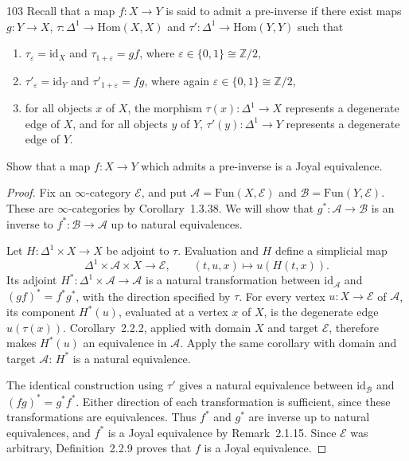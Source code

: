 \begin{exercise}{103}
Recall that a map $f\colon X\to Y$ is said to admit a pre-inverse if there exist maps
$g\colon Y\to X$, $\tau\colon\Delta^1\to\mathrm{Hom}(X,X)$ and
$\tau'\colon\Delta^1\to\mathrm{Hom}(Y,Y)$ such that
\begin{enumerate}[label=(\arabic*)]
 \item $\tau_\varepsilon=\mathrm{id}_X$ and $\tau_{1+\varepsilon}=gf$, where
       $\varepsilon\in\{0,1\}\cong\mathbb Z/2$,
 \item $\tau'_\varepsilon=\mathrm{id}_Y$ and $\tau'_{1+\varepsilon}=fg$, where again
       $\varepsilon\in\{0,1\}\cong\mathbb Z/2$,
 \item for all objects $x$ of $X$, the morphism $\tau(x)\colon\Delta^1\to X$
       represents a degenerate edge of $X$, and for all objects $y$ of $Y$,
       $\tau'(y)\colon\Delta^1\to Y$ represents a degenerate edge of $Y$.
\end{enumerate}
Show that a map $f\colon X\to Y$ which admits a pre-inverse is a Joyal equivalence.

\begin{proof}
Fix an $\infty$-category $\mathcal E$, and put
$\mathcal A=\mathrm{Fun}(X,\mathcal E)$ and
$\mathcal B=\mathrm{Fun}(Y,\mathcal E)$.
These are $\infty$-categories by Corollary~1.3.38.
We will show that $g^*\colon\mathcal A\to\mathcal B$ is an inverse to
$f^*\colon\mathcal B\to\mathcal A$ up to natural equivalences.

Let $H\colon\Delta^1\times X\to X$ be adjoint to $\tau$.
Evaluation and $H$ define a simplicial map
\[
 \Delta^1\times\mathcal A\times X\longrightarrow\mathcal E,
 \qquad (t,u,x)\longmapsto u(H(t,x)).
\]
Its adjoint $H^*\colon\Delta^1\times\mathcal A\to\mathcal A$ is a
natural transformation between $\mathrm{id}_{\mathcal A}$ and
$(gf)^*=f^*g^*$, with the direction specified by $\tau$.
For every vertex $u\colon X\to\mathcal E$ of $\mathcal A$, its component
$H^*(u)$, evaluated at a vertex $x$ of $X$, is the degenerate edge
$u(\tau(x))$.
Corollary~2.2.2, applied with domain $X$ and target $\mathcal E$,
therefore makes $H^*(u)$ an equivalence in $\mathcal A$.
Apply the same corollary with domain and target $\mathcal A$:
$H^*$ is a natural equivalence.

The identical construction using $\tau'$ gives a natural equivalence
between $\mathrm{id}_{\mathcal B}$ and $(fg)^*=g^*f^*$.
Either direction of each transformation is sufficient, since these
transformations are equivalences.
Thus $f^*$ and $g^*$ are inverse up to natural equivalences, and
$f^*$ is a Joyal equivalence by Remark~2.1.15.
Since $\mathcal E$ was arbitrary, Definition~2.2.9 proves that $f$
is a Joyal equivalence.
\end{proof}
\end{exercise}
